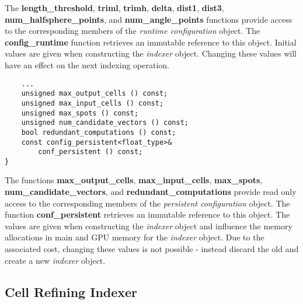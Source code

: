 \documentclass[a4paper,10pt]{article}
\begin{document}
%
The \textbf{length\_threshold}, \textbf{triml}, \textbf{trimh}, \textbf{delta}, \textbf{dist1}, \textbf{dist3}, \textbf{num\_half\-sphe\-re\_points}, and \textbf{num\_angle\_points} functions provide access to the corresponding members of the \emph{runtime configuration} object. The \textbf{config\_runtime} function retrieves an immutable reference to this object. Initial values are given when constructing the \emph{indexer} object. Changing these values will have an effect on the next indexing operation.
%
\begin{lstlisting}
    ...
    unsigned max_output_cells () const;
    unsigned max_input_cells () const;
    unsigned max_spots () const;
    unsigned num_candidate_vectors () const;
    bool redundant_computations () const;
    const config_persistent<float_type>&
        conf_persistent () const;
}
\end{lstlisting}
%
The functions \textbf{max\_output\_cells}, \textbf{max\_input\_cells}, \textbf{max\_spots}, \textbf{num\_can\-di\-da\-te\_vec\-tors}, and \textbf{redundant\_computations} provide read only access to the corresponding members of the \emph{persistent configuration} object. The function \textbf{conf\_persistent} retrieves an immutable reference to this object. The values are given when constructing the \emph{indexer} object and influence the memory allocations in main and GPU memory for the \emph{indexer} object. Due to the associated cost, changing these values is not possible - instead discard the old and create a new \emph{indexer} object.

\subsection{Cell Refining Indexer}
\end{document}
